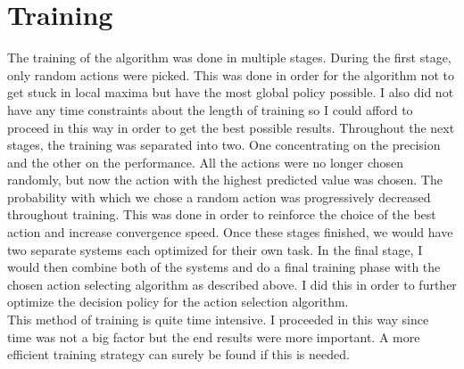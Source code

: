 \section{Training}
The training of the algorithm was done in multiple stages. During the first stage, only random actions were picked. This was done in order for the algorithm not to get stuck in local maxima but have the most global policy possible. I also did not have any time constraints about the length of training so I could afford to proceed in this way in order to get the best possible results. Throughout the next stages, the training was separated into two. One concentrating on the precision and the other on the performance. All the actions were no longer chosen randomly, but now the action with the highest predicted value was chosen. The probability with which we chose a random action was progressively decreased throughout training. This was done in order to reinforce the choice of the best action and increase convergence speed. Once these stages finished, we would have two separate systems each optimized for their own task. In the final stage, I would then combine both of the systems and do a final training phase with the chosen action selecting algorithm as described above. I did this in order to further optimize the decision policy for the action selection algorithm.\\
This method of training is quite time intensive. I proceeded in this way since time was not a big factor but the end results were more important. A more efficient training strategy can surely be found if this is needed.
